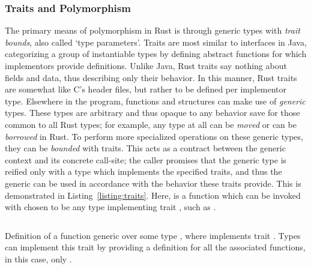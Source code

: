 \subsubsection{Traits and Polymorphism}
The primary means of polymorphism in Rust is through generic types with \textit{trait bounds}, also called `type parameters'. Traits are most similar to interfaces in Java, categorizing a group of instantiable types by defining abstract functions for which implementors provide definitions. Unlike Java, Rust traits say nothing about fields and data, thus describing only their behavior. In this manner, Rust traits are somewhat like C's header files, but rather to be defined per implementor type. Elsewhere in the program, functions and structures can make use of \textit{generic} types. These types are arbitrary and thus opaque to any behavior save for those common to all Rust types; for example, any type at all can be \textit{moved} or can be \textit{borrowed} in Rust. To perform more specialized operations on these generic types, they can be \textit{bounded} with traits. This acts as a contract between the generic context and its concrete call-site; the caller promises that the generic type is reified only with a type which implements the specified traits, and thus the generic can be used in accordance with the behavior these traits provide. This is demonstrated in Listing~\ref{listing:traits}. Here,  is a function which can be invoked with  chosen to be any type implementing trait , such as . 

\begin{listing}[ht]
	\centering
	\inputminted[]{rust}{traits.rs}
	\caption[Generic type example in Rust.]{Definition of a function  generic over some type , where  implements trait . Types can implement this trait by providing a definition for all the associated functions, in this case, only .}
	\label{listing:traits}
\end{listing}

